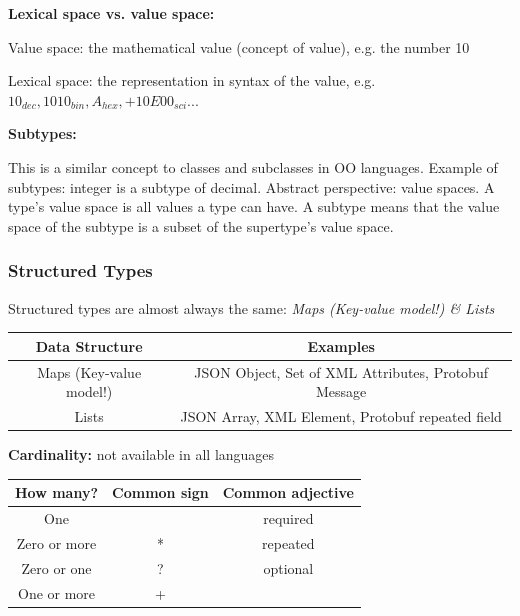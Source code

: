 \documentclass[11pt,oneside,a4paper]{article}
\begin{document}
\textbf{Lexical space vs. value space:}

\begin{compactitem}
	\item Value space: the mathematical value (concept of value), e.g. the number 10
	\item Lexical space: the representation in syntax of the value, e.g. $10_{dec}, 1010_{bin}, A_{hex},+10E00_{sci}...$\\
\end{compactitem}

\textbf{Subtypes:}

This is a similar concept to classes and subclasses in OO languages. Example of subtypes: integer is a subtype of decimal. Abstract perspective: value spaces. A type's value space is all values a type can have. A subtype means that the value space of the subtype is a subset of the supertype's value space.

\subsubsection{Structured Types}

Structured types are almost always the same: \textit{Maps (Key-value model!) \& Lists}

\begin{tabular}{|c|c|}
	\hline 
	\textbf{Data Structure} & \textbf{Examples} \\ 
	\hline 
	Maps (Key-value model!)& JSON Object, Set of XML Attributes, Protobuf Message \\ 
	\hline 
	Lists & JSON Array,	XML Element, Protobuf repeated field \\ 
	\hline 
\end{tabular} 

\hfill

\textbf{Cardinality:} not available in all languages

\begin{tabular}{|c|c|c|}
	\hline 
	\textbf{How many?} & \textbf{Common sign} & \textbf{Common adjective} \\ 
	\hline 
	One &  & required \\ 
	\hline 
	Zero or more & * & repeated \\ 
	\hline 
	Zero or one & ? & optional \\ 
	\hline 
	One or more & + &  \\ 
	\hline 
\end{tabular}

\hfill
\end{document}
